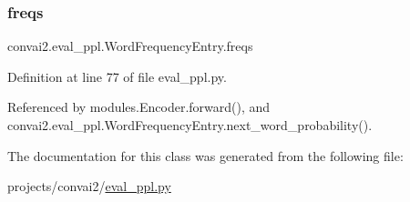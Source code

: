 \subsubsection{\texorpdfstring{freqs}{freqs}}
{\footnotesize\ttfamily convai2.\+eval\+\_\+ppl.\+Word\+Frequency\+Entry.\+freqs}



Definition at line 77 of file eval\+\_\+ppl.\+py.



Referenced by modules.\+Encoder.\+forward(), and convai2.\+eval\+\_\+ppl.\+Word\+Frequency\+Entry.\+next\+\_\+word\+\_\+probability().



The documentation for this class was generated from the following file\+:\begin{DoxyCompactItemize}
\item 
projects/convai2/\hyperlink{projects_2convai2_2eval__ppl_8py}{eval\+\_\+ppl.\+py}\end{DoxyCompactItemize}
